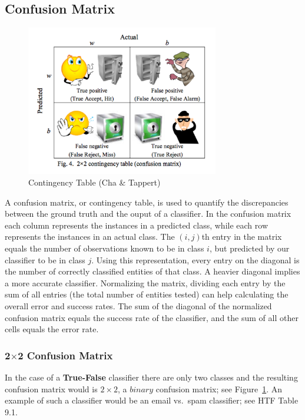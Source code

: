 \documentclass[a4paper]{article}
\begin{document}
\subsection{Confusion Matrix}

\begin{figure}
\centering
\includegraphics[width=0.75\textwidth]{ChaTappertFig.png}
\caption{\label{contingency_table}Contingency Table (Cha \& Tappert)}
\end{figure}

A confusion matrix, or contingency table, is used to quantify the discrepancies between the ground truth and the ouput of a classifier. In the confusion matrix each column represents the instances in a predicted class, while each row represents the instances in an actual class. The $(i,j)$th entry in the matrix equals the number of observations known to be in class $i$, but predicted by our classifier to be in class $j$. Using this representation, every entry on the diagonal is the number of correctly classified entities of that class. A heavier diagonal implies a more accurate classifier.
Normalizing the matrix, dividing each entry by the sum of all entries (the total number of entities tested) can help calculating the overall error and success rates. The sum of the diagonal of the normalized confusion matrix equals the success rate of the classifier, and the sum of all other cells equals the error rate.

\subsubsection{2$\times$2 Confusion Matrix}
In the case of a \textbf{True-False} classifier there are only two classes and the resulting confusion matrix would is $2\times 2$, a $binary$ confusion matrix; see Figure~\ref{contingency_table}. An example of such a classifier would be an email vs.\ spam classifier; see HTF Table 9.1.
\end{document}
